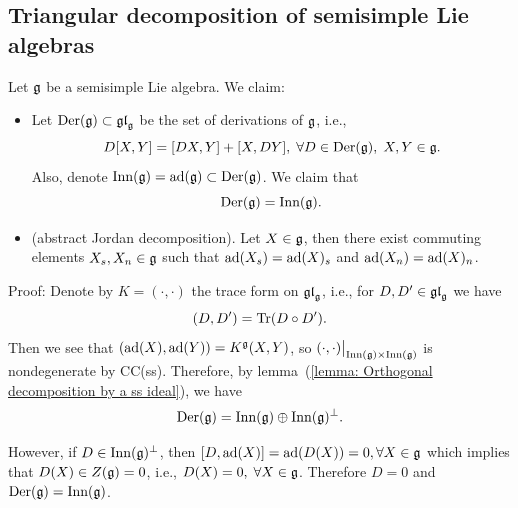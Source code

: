 \subsection{Triangular decomposition of semisimple Lie algebras}
\begin{dang}
    \begin{lemma}\label{Lemma: abstract Jordan decomposition}
        Let $\mathfrak{g}$ be a semisimple Lie algebra. We claim:
        \begin{itemize}
            \item[1.] Let $\text{Der}(\mathfrak{g})\subset \mathfrak{gl}_{\mathfrak{g}}$ be the set of derivations of $\mathfrak{g}$, i.e.,
            \begin{equation} 
                D[X,Y]=[DX,Y]+[X,DY],\;\forall D\in\text{Der}(\mathfrak{g}),\; X,Y\in\mathfrak{g}.
            \end{equation}   
             Also, denote $\text{Inn}(\mathfrak{g})=\text{ad}(\mathfrak{g})\subset \text{Der}(\mathfrak{g})$. We claim that 
            \begin{equation}
                \text{Der}(\mathfrak{g})=\text{Inn}(\mathfrak{g}).
            \end{equation}
            \item[2.] (abstract Jordan decomposition). Let $X\in\mathfrak{g}$, then there exist
            commuting elements $X_s,X_n\in\mathfrak{g}$ such that 
            $\text{ad}(X_s)=\text{ad}(X)_s$ and $\text{ad}(X_n)=\text{ad}(X)_n$.
        \end{itemize}
    \end{lemma}
\end{dang}
Proof: Denote by $K=(\cdot,\cdot)$ the trace form on $\mathfrak{gl}_{\mathfrak{g}}$, i.e., for $D,D^\prime\in\mathfrak{gl}_{\mathfrak{g}}$ 
we have 
\begin{equation}
    (D,D^\prime)=\text{Tr}(D\circ D^\prime).
\end{equation}
Then we see that $(\text{ad}(X),\text{ad}(Y))=K^{\mathfrak{g}}(X,Y)$, so 
$(\cdot,\cdot)\big|_{\text{Inn}(\mathfrak{g})\times\text{Inn}(\mathfrak{g})}$ is nondegenerate by CC(ss). 
Therefore, by lemma~(\ref{lemma: Orthogonal decomposition by a ss ideal}), we have
\begin{equation}
    \text{Der}(\mathfrak{g})=\text{Inn}(\mathfrak{g})\oplus \text{Inn}(\mathfrak{g})^\perp.
\end{equation}

However, if $D\in \text{Inn}(\mathfrak{g})^\perp$, then $[D,\text{ad}(X)]=\text{ad}(D(X))=0,\forall X\in\mathfrak{g}$ which implies that 
$D(X)\in Z(\mathfrak{g})=0$, i.e., $D(X)=0,\;\forall X\in\mathfrak{g}$. Therefore $D=0$ and 
$\text{Der}(\mathfrak{g})=\text{Inn}(\mathfrak{g})$.\par 

